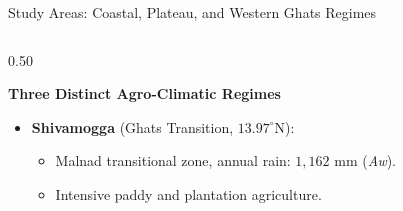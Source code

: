\documentclass[aspectratio=169, 10pt]{beamer}
\begin{document}
\begin{frame}{Study Areas: Coastal, Plateau, and Western Ghats Regimes}
\begin{columns}
\begin{column}{0.50\textwidth}
\begin{block}{\textbf{Three Distinct Agro-Climatic Regimes}}
\begin{itemize}
                    \item \textbf{Shivamogga} (Ghats Transition, $13.97^\circ\text{N}$):
                    \begin{itemize}
                        \item Malnad transitional zone, annual rain: $1,162\text{ mm}$ (\textit{Aw}).
                        \item Intensive paddy and plantation agriculture.
                    \end{itemize}
                \end{itemize}
            \end{block}
        \end{column}
    \end{columns}
\end{frame}
\end{document}
